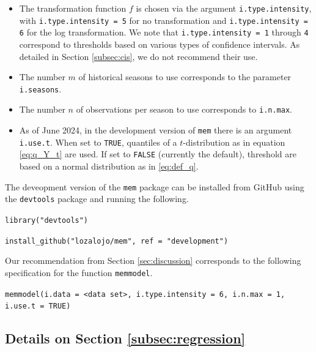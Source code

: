\documentclass[12pt]{article}
\begin{document}
\begin{itemize}
\item The transformation function $f$ is chosen via the argument \texttt{i.type.intensity}, with \texttt{i.type.intensity = 5} for no transformation and \texttt{i.type.intensity = 6} for the log transformation. We note that \texttt{i.type.intensity = 1} through \texttt{4} correspond to thresholds based on various types of confidence intervals. As detailed in Section \ref{subsec:cis}, we do not recommend their use.
\item The number $m$ of historical seasons to use corresponds to the parameter \texttt{i.seasons}.
\item The number $n$ of observations per season to use corresponds to \texttt{i.n.max}.
\item As of June 2024, in the development version of \texttt{mem} there is an argument \texttt{i.use.t}. When set to \texttt{TRUE}, quantiles of a $t$-distribution as in equation \eqref{eq:q_Y_t} are used. If set to \texttt{FALSE} (currently the default), threshold are based on a normal distribution as in \eqref{eq:def_q}.
\end{itemize}
The deveopment version of the \texttt{mem} package can be installed from GitHub using the \texttt{devtools} package and running the following.
\medskip

\texttt{library("devtools")}

\texttt{install\_github("lozalojo/mem", ref = "development")}

\medskip

\noindent Our recommendation from Section \ref{sec:discussion} corresponds to the following specification for the function \texttt{memmodel}.
\medskip

\texttt{memmodel(i.data = <data set>, i.type.intensity = 6, i.n.max = 1, i.use.t = TRUE)}

\medskip

\subsection{Details on Section \ref{subsec:regression}}
\label{suppl:regression}
\end{document}
